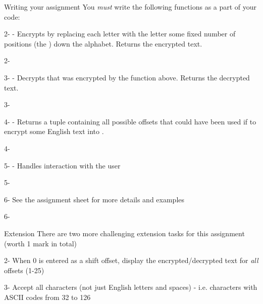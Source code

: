 \documentclass[week3]{csse1001}
\begin{document}
\begin{topic}{Writing your assignment}
You \textit{must} write the following functions as a part of your code:\\

\begin{subtopic}{2-}
 - Encrypts  by replacing each letter with the letter some fixed number of positions (the ) down the alphabet. Returns the encrypted text.
\end{subtopic}{2-}
\begin{subtopic}{3-}
 - Decrypts  that was encrypted by the function above. Returns the decrypted text.
\end{subtopic}{3-}
\begin{subtopic}{4-}
 - Returns a tuple containing all possible offsets that could have been used if to encrypt some English text into .
\end{subtopic}{4-}
\begin{subtopic}{5-}
 - Handles interaction with the user
\end{subtopic}{5-}
\begin{subtopic}{6-}
See the assignment sheet for more details and examples
\end{subtopic}{6-}

\end{topic}

\begin{topic}{Extension}
There are two more challenging extension tasks for this assignment (worth 1 mark in total)\\

\begin{subtopic}{2-}
When 0 is entered as a shift offset, display the encrypted/decrypted text for \textit{all} offsets (1-25)
\end{subtopic}
\begin{subtopic}{3-}
Accept all characters (not just English letters and spaces) - i.e. characters with ASCII codes from 32 to 126
\end{subtopic}

\end{topic}
\end{document}
